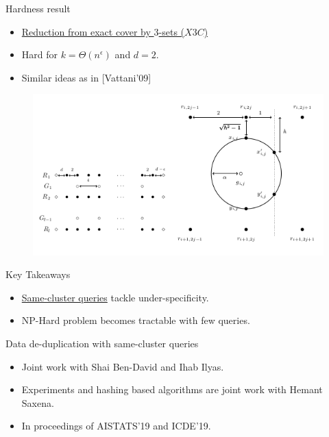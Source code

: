 \documentclass{beamer}
\begin{document}
\begin{frame}[label=queryNegative]{Hardness result}
	\begin{itemize}
		\item \hyperlink{resultQueryNegative}{Reduction from exact cover by $3$-sets ($X3C$)}
		\item Hard for $k = \Theta(n^\epsilon)$ and $d = 2$.
		\item Similar ideas as in \alert{[Vattani'09]}
	\end{itemize}
	
	\begin{figure}
		\centering
		\includegraphics[trim=0 0 0 0,scale=0.5]{figures/hardnessFig.png}
	\end{figure}
\end{frame}

\begin{frame}[label=queryTakeaways]{Key Takeaways}
	
	\begin{itemize}
		\item \hyperlink{notesQueryTakeaways}{Same-cluster queries} tackle under-specificity.
		\vspace{30pt}\item NP-Hard problem becomes {\color{blue}tractable with few queries}. 
	\end{itemize}
\end{frame}


\begin{frame}{Data de-duplication with same-cluster queries}
	\begin{itemize}
		\item Joint work with Shai Ben-David and Ihab Ilyas.
		\vspace{20pt}\item Experiments and hashing based algorithms are joint work with Hemant Saxena.		
		\vspace{20pt} \item In proceedings of \alert{AISTATS'19} and \alert{ICDE'19}.
	\end{itemize}
\end{frame}
\end{document}
